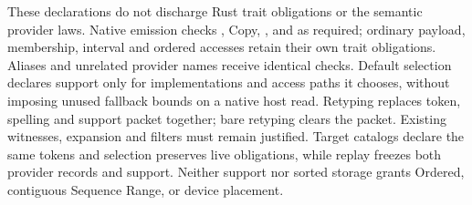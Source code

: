 These declarations do not discharge Rust trait obligations or the semantic
provider laws. Native emission checks , Copy,
, and  as required; ordinary payload,
membership, interval and ordered accesses retain their own trait obligations.
Aliases and unrelated provider names receive identical checks. Default selection
declares support only for implementations and access paths it chooses, without
imposing unused fallback bounds on a native host read.
Retyping replaces token, spelling and support packet together; bare retyping clears the packet. Existing witnesses,
expansion and filters must remain justified. Target catalogs declare the same
tokens and selection preserves live obligations, while replay freezes
both provider records and support. Neither support nor sorted storage grants
Ordered, contiguous Sequence Range, or device placement.
